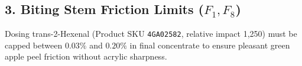 \documentclass[11pt,a4paper]{article}
\begin{document}
\subsection{3. Biting Stem Friction Limits (\texorpdfstring{$F_1, F_8$}{F1, F8})}
Dosing trans-2-Hexenal (Product SKU \texttt{4GA02582}, relative impact 1,250) must be capped between $0.03\%$ and $0.20\%$ in final concentrate to ensure pleasant green apple peel friction without acrylic sharpness.
\end{document}
